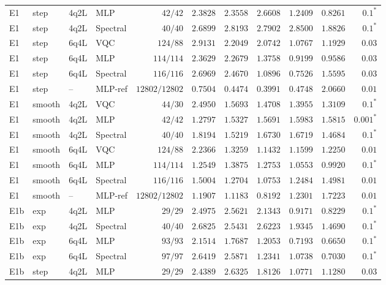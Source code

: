 \documentclass[11pt]{article}
\begin{document}
\begin{longtable}{llllrrrrrrr}
E1 & step & 4q2L & MLP & $42/42$ & $2.3828$ & $2.3558$ & $2.6608$ & $1.2409$ & $0.8261$ & $0.1^{\ast}$ \\
E1 & step & 4q2L & Spectral & $40/40$ & $2.6899$ & $2.8193$ & $2.7902$ & $2.8500$ & $1.8826$ & $0.1^{\ast}$ \\
E1 & step & 6q4L & VQC & $124/88$ & $2.9131$ & $2.2049$ & $2.0742$ & $1.0767$ & $1.1929$ & $0.03$ \\
E1 & step & 6q4L & MLP & $114/114$ & $2.3629$ & $2.2679$ & $1.3758$ & $0.9199$ & $0.9586$ & $0.03$ \\
E1 & step & 6q4L & Spectral & $116/116$ & $2.6969$ & $2.4670$ & $1.0896$ & $0.7526$ & $1.5595$ & $0.03$ \\
E1 & step & -- & MLP-ref & $12802/12802$ & $0.7504$ & $0.4474$ & $0.3991$ & $0.4748$ & $2.0660$ & $0.01$ \\
E1 & smooth & 4q2L & VQC & $44/30$ & $2.4950$ & $1.5693$ & $1.4708$ & $1.3955$ & $1.3109$ & $0.1^{\ast}$ \\
E1 & smooth & 4q2L & MLP & $42/42$ & $1.2797$ & $1.5327$ & $1.5691$ & $1.5983$ & $1.5815$ & $0.001^{\ast}$ \\
E1 & smooth & 4q2L & Spectral & $40/40$ & $1.8194$ & $1.5219$ & $1.6730$ & $1.6719$ & $1.4684$ & $0.1^{\ast}$ \\
E1 & smooth & 6q4L & VQC & $124/88$ & $2.2366$ & $1.3259$ & $1.1432$ & $1.1599$ & $1.2250$ & $0.01$ \\
E1 & smooth & 6q4L & MLP & $114/114$ & $1.2549$ & $1.3875$ & $1.2753$ & $1.0553$ & $0.9920$ & $0.1^{\ast}$ \\
E1 & smooth & 6q4L & Spectral & $116/116$ & $1.5004$ & $1.2704$ & $1.0753$ & $1.2484$ & $1.4981$ & $0.01$ \\
E1 & smooth & -- & MLP-ref & $12802/12802$ & $1.1907$ & $1.1183$ & $0.8192$ & $1.2301$ & $1.7223$ & $0.01$ \\
\midrule
E1b & exp & 4q2L & MLP & $29/29$ & $2.4975$ & $2.5621$ & $2.1343$ & $0.9171$ & $0.8229$ & $0.1^{\ast}$ \\
E1b & exp & 4q2L & Spectral & $40/40$ & $2.6825$ & $2.5431$ & $2.6223$ & $1.9345$ & $1.4690$ & $0.1^{\ast}$ \\
E1b & exp & 6q4L & MLP & $93/93$ & $2.1514$ & $1.7687$ & $1.2053$ & $0.7193$ & $0.6650$ & $0.1^{\ast}$ \\
E1b & exp & 6q4L & Spectral & $97/97$ & $2.6419$ & $2.5871$ & $1.2341$ & $1.0738$ & $0.7030$ & $0.1^{\ast}$ \\
E1b & step & 4q2L & MLP & $29/29$ & $2.4389$ & $2.6325$ & $1.8126$ & $1.0771$ & $1.1280$ & $0.03$ \\

\end{longtable}
\end{document}
